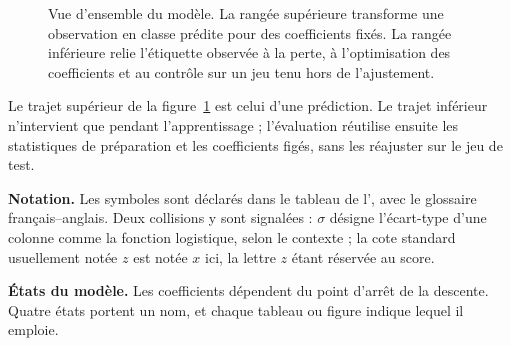 \begin{figure}[htbp]
\begin{graphique}
\end{graphique}
\caption{Vue d'ensemble du modèle. La rangée supérieure transforme une
observation en classe prédite pour des coefficients fixés. La rangée inférieure
relie l'étiquette observée à la perte, à l'optimisation des coefficients et au
contrôle sur un jeu tenu hors de l'ajustement.}
\label{fig:carte}
\end{figure}
\FloatBarrier

Le trajet supérieur de la figure~\ref{fig:carte} est celui d'une prédiction. Le
trajet inférieur n'intervient que pendant l'apprentissage ; l'évaluation
réutilise ensuite les statistiques de préparation et les coefficients figés,
sans les réajuster sur le jeu de test.

\textbf{Notation.} Les symboles sont déclarés dans le tableau de
l', avec le glossaire français--anglais. Deux collisions
y sont signalées : $\sigma$ désigne l'écart-type d'une colonne comme la fonction
logistique, selon le contexte ; la cote standard usuellement notée $z$ est notée
$x$ ici, la lettre $z$ étant réservée au score.

\textbf{États du modèle.} Les coefficients dépendent du point d'arrêt de la
descente. Quatre états portent un nom, et chaque tableau ou figure indique
lequel il emploie.

